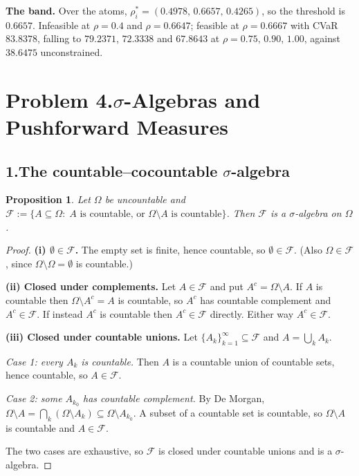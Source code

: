 \documentclass[11pt]{article}
\newtheorem{proposition}{Proposition}
\theoremstyle{definition}
\begin{document}
\textbf{The band.} Over the atoms, $\rho^{*}_i = (0.4978,\,0.6657,\,
0.4265)$, so the threshold is $0.6657$. Infeasible at $\rho = 0.4$ and
$\rho = 0.6647$; feasible at $\rho = 0.6667$ with CVaR $83.8378$, falling
to $79.2371$, $72.3338$ and $67.8643$ at $\rho = 0.75,\,0.90,\,1.00$,
against $38.6475$ unconstrained.

\newpage
\section*{Problem 4.\quad $\sigma$-Algebras and Pushforward Measures
  \quad[30 pts]}

\subsection*{1.\quad The countable--cocountable $\sigma$-algebra}

\begin{proposition}
Let $\Omega$ be uncountable and
$\mathcal{F} := \{A \subseteq \Omega :\; A \text{ is countable, or }
\Omega\setminus A \text{ is countable}\}$. Then $\mathcal{F}$ is a
$\sigma$-algebra on $\Omega$.
\end{proposition}

\begin{proof}
\textbf{(i) $\emptyset \in \mathcal{F}$.} The empty set is finite, hence
countable, so $\emptyset \in \mathcal{F}$. (Also $\Omega \in \mathcal{F}$,
since $\Omega\setminus\Omega = \emptyset$ is countable.)

\textbf{(ii) Closed under complements.} Let $A \in \mathcal{F}$ and put
$A^{c} = \Omega\setminus A$. If $A$ is countable then
$\Omega\setminus A^{c} = A$ is countable, so $A^{c}$ has countable
complement and $A^{c} \in \mathcal{F}$. If instead $A^{c}$ is countable
then $A^{c} \in \mathcal{F}$ directly. Either way $A^{c} \in \mathcal{F}$.

\textbf{(iii) Closed under countable unions.} Let
$\{A_k\}_{k=1}^{\infty} \subseteq \mathcal{F}$ and $A = \bigcup_k A_k$.

\emph{Case 1: every $A_k$ is countable.} Then $A$ is a countable union of
countable sets, hence countable, so $A \in \mathcal{F}$.

\emph{Case 2: some $A_{k_0}$ has countable complement.} By De Morgan,
$\Omega\setminus A = \bigcap_k (\Omega\setminus A_k) \subseteq
\Omega\setminus A_{k_0}$. A subset of a countable set is countable, so
$\Omega\setminus A$ is countable and $A \in \mathcal{F}$.

The two cases are exhaustive, so $\mathcal{F}$ is closed under countable
unions and is a $\sigma$-algebra.
\end{proof}
\end{document}
